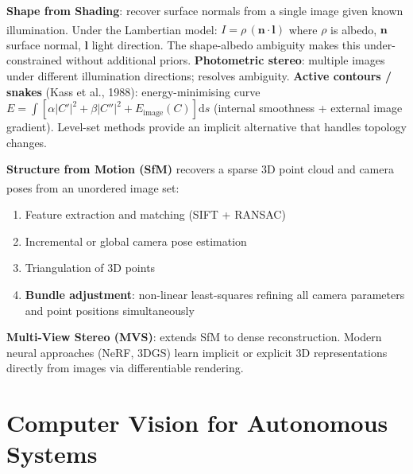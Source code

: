 \begin{tcbitemize}[ skin=sectionraster ]
    \tcbitem[title={Shape from Shading and Stereo}, raster multicolumn=3]
    \textbf{Shape from Shading}: recover surface normals from a single image given known illumination\textsuperscript{\cite[][pp.~667--676]{szeliski2022}}.
    Under the Lambertian model: $I = \rho\,(\mathbf{n} \cdot \mathbf{l})$
    where $\rho$ is albedo, $\mathbf{n}$ surface normal, $\mathbf{l}$ light direction.
    The shape-albedo ambiguity makes this under-constrained without additional priors.
    \textbf{Photometric stereo}: multiple images under different illumination directions; resolves ambiguity.
    \tcblower
    \textbf{Active contours / snakes} (Kass et al., 1988): energy-minimising curve
    $E = \int \left[\alpha|C'|^2 + \beta|C''|^2 + E_{\mathrm{image}}(C)\right] \mathrm{d}s$
    (internal smoothness + external image gradient). Level-set methods provide an implicit alternative that handles topology changes.

    \tcbitem[title={3D Reconstruction and Structure from Motion}, raster multicolumn=3]
    \textbf{Structure from Motion (SfM)} recovers a sparse 3D point cloud and camera poses from an unordered image set\textsuperscript{\cite[][pp.~719--733]{szeliski2022}}:
    \begin{enumerate}
        \item Feature extraction and matching (SIFT + RANSAC)
        \item Incremental or global camera pose estimation
        \item Triangulation of 3D points
        \item \textbf{Bundle adjustment}: non-linear least-squares refining all camera parameters and point positions simultaneously
    \end{enumerate}
    \textbf{Multi-View Stereo (MVS)}: extends SfM to dense reconstruction.
    Modern neural approaches (NeRF, 3DGS) learn implicit or explicit 3D representations directly from images via differentiable rendering.
\end{tcbitemize}


\section{Computer Vision for Autonomous Systems}

